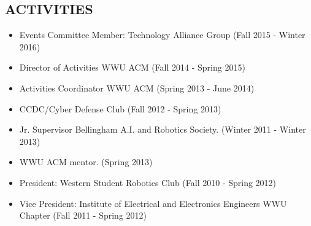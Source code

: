 \documentclass[line,margin]{res}
\begin{document}
\begin{resume}
\section{ACTIVITIES} 
    \begin{itemize} \itemsep -3pt
    \item Events Committee Member: Technology Alliance Group {\footnotesize (Fall 2015 - Winter 2016)}
    \item Director of Activities WWU ACM {\footnotesize (Fall 2014 - Spring 2015)}
    \item Activities Coordinator WWU ACM {\footnotesize (Spring 2013 - June 2014)}
    \item CCDC/Cyber Defense Club {\footnotesize (Fall 2012 - Spring 2013)}
    \item Jr. Supervisor Bellingham A.I. and Robotics Society. {\footnotesize (Winter 2011 - Winter 2013)}
    \item WWU ACM mentor. {\footnotesize (Spring 2013)}
    \item President: Western Student Robotics Club {\footnotesize(Fall 2010 - Spring 2012)}
    \item Vice President: Institute of Electrical and Electronics Engineers WWU Chapter {\footnotesize(Fall 2011 - Spring 2012)}
    \end{itemize}
    
\end{resume}
\end{document}
